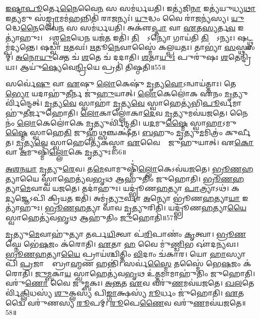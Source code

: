 \ul{𑌇}\ul{𑌷𑍍𑌟𑌾}\ul{𑌪𑍂}𑌰𑍍𑌤𑍇\ul{𑌨𑍈}𑌵𑍈\ul{𑌨}\ul{} 𑌸 𑌸𑌮॑𑌰𑍍𑌧𑌯𑌤𑌿।
𑌇𑌤𑍍𑌯॑𑌜𑌿\ul{𑌨𑌾} 𑌇𑌤𑍍𑌯॑𑌯𑍁𑌧𑍍𑌯\ul{𑌥𑌾} 𑌇\ul{𑌤𑍍𑌯}𑌮𑍁 𑌸॑\ul{𑌙𑍍𑌗𑍍𑌰𑌾}𑌮𑌮॑\ul{𑌹}𑌨𑍍𑌨𑌿𑌤𑌿॑ 𑌰𑌾\ul{𑌜}𑌨𑍍𑌯𑌃॑।
\ul{𑌯𑍁}𑌦𑍍𑌧𑌂 𑌵𑍈 𑌰𑌾॑\ul{𑌜}𑌨𑍍𑌯॑𑌸𑍍𑌯।
\ul{𑌯𑍁}𑌦𑍍𑌧𑍇\ul{𑌨𑍈}𑌵𑍈\ul{𑌨}\ul{} 𑌸 𑌸𑌮॑𑌰𑍍𑌧𑌯𑌤𑌿।
𑌅𑌕𑍢॑\ul{𑌪𑍍𑌤𑌾} 𑌵𑌾 \ul{𑌏}𑌤\ul{𑌸𑍍𑌯}𑌰𑍍𑌤\ul{𑌵} 𑌇𑌤𑍍𑌯𑌾॑𑌹𑍁𑌃।
𑌯𑍋᳚𑌽𑌶𑍍𑌵\ul{𑌮𑍇}𑌧𑍇\ul{𑌨} 𑌯𑌜॑\ul{𑌤} 𑌇𑌤𑌿॑।
\ul{𑌤𑌿}𑌸𑍍𑌰𑍋᳚\-𑌽𑌨𑍍𑌯𑍋 𑌗𑌾𑌯॑𑌤𑌿 \ul{𑌤𑌿}𑌸𑍍𑌰𑍋᳚\-𑌽𑌨𑍍𑌯𑌃।
𑌷𑌟𑍍𑌥𑍍𑌸𑌮𑍍𑌪॑𑌦𑍍𑌯𑌨𑍍𑌤𑍇।
𑌷𑌡𑍍𑌵𑌾 \ul{𑌋}𑌤𑌵𑌃॑।
\ul{𑌋}𑌤𑍂\ul{𑌨𑍇}𑌵𑌾𑌸𑍍𑌮𑍈॑ 𑌕𑌲𑍍𑌪𑌯𑌤𑌃।
𑌤𑌾𑌭𑍍𑌯𑌾॑ \ul{𑌸}\ul{}𑌸𑍍𑌥𑌾𑌯𑌾᳚𑌮𑍍।
\ul{𑌅}\ul{𑌨𑍋}\ul{𑌯𑍁}𑌕𑍍𑌤𑍇 𑌚॑ \ul{𑌶}𑌤𑍇 𑌚॑ 𑌦𑌦𑌾𑌤𑌿।
\ul{𑌶}𑌤𑌾\ul{𑌯𑍁𑌃} 𑌪𑍁𑌰𑍁॑𑌷𑌃 \ul{𑌶}𑌤𑍇𑌨𑍍𑌦𑍍𑌰𑌿॑𑌯𑌃।
𑌆𑌯𑍁॑\ul{𑌷𑍍𑌯𑍇}𑌵𑍇\ul{𑌨𑍍𑌦𑍍𑌰𑌿}𑌯𑍇 𑌪𑍍𑌰𑌤𑌿॑ 𑌤𑌿𑌷𑍍𑌠𑌤𑌿॥55॥\anuvakamend[𑌗𑌾𑌯𑍇॑𑌤𑌾𑌙𑍍𑌕𑍍𑌰𑌾𑌮𑍇𑌦𑍍𑌬𑍍𑌰𑌾\ul{𑌹𑍍𑌮}𑌣𑌸𑍍𑌯॑ 𑌕𑌲𑍍𑌪𑌯𑌤\ul{𑌶𑍍𑌚}𑌤𑍍𑌵𑌾𑌰𑌿॑ 𑌚]

𑌸𑌰𑍍𑌵𑍇॑\ul{𑌷𑍁} 𑌵𑌾 \ul{𑌏}𑌷𑍁 \ul{𑌲𑍋}𑌕𑍇𑌷𑍁॑ \ul{𑌮𑍃}𑌤𑍍𑌯\ul{𑌵𑍋}\-𑌽𑌨𑍍𑌵𑌾𑌯॑𑌤𑍍𑌤𑌾𑌃।
𑌤𑍇\ul{𑌭𑍍𑌯𑍋} 𑌯𑌦𑌾𑌹𑍁॑\ul{𑌤𑍀}𑌰𑍍𑌨 𑌜𑍁॑\ul{𑌹𑍁}𑌯𑌾𑌤𑍍।
\ul{𑌲𑍋}𑌕𑍇𑌲𑍋॑𑌕 𑌏𑌨𑌂 \ul{𑌮𑍃}𑌤𑍍𑌯𑍁𑌰𑍍𑌵𑌿॑𑌨𑍍𑌦𑍇𑌤𑍍।
\ul{𑌮𑍃}𑌤𑍍𑌯\ul{𑌵𑍇} 𑌸𑍍𑌵𑌾𑌹𑌾॑ \ul{𑌮𑍃}𑌤𑍍𑌯\ul{𑌵𑍇} 𑌸𑍍𑌵𑌾𑌹𑍇𑌤𑍍𑌯॑𑌭𑌿\ul{𑌪𑍂}𑌰𑍍𑌵𑌮𑌾𑌹𑍁॑𑌤𑍀𑌰𑍍𑌜𑍁𑌹𑍋𑌤𑌿।
\ul{𑌲𑍋}𑌕𑌾𑌲𑍍𑌲𑍋॑𑌕𑌾\ul{𑌦𑍇}𑌵 \ul{𑌮𑍃}𑌤𑍍𑌯𑍁𑌮𑌵॑𑌯𑌜𑌤𑍇।
𑌨𑍈𑌨𑌂॑ \ul{𑌲𑍋}𑌕𑍇𑌲𑍋॑𑌕𑍇 \ul{𑌮𑍃}𑌤𑍍𑌯𑍁𑌰𑍍𑌵𑌿॑𑌨𑍍𑌦𑌤𑌿।
𑌯\ul{𑌦}𑌮𑍁\ul{𑌷𑍍𑌮𑍈} 𑌸𑍍𑌵𑌾\ul{𑌹𑌾}\-𑌽𑌮𑍁\ul{𑌷𑍍𑌮𑍈} 𑌸𑍍𑌵𑌾𑌹𑍇\ul{𑌤𑌿} 𑌜𑍁𑌹𑍍𑌵॑\ul{𑌥𑍍𑌸}𑌞𑍍𑌚𑌕𑍍𑌷𑍀॑𑌤।
\ul{𑌬}𑌹𑍁𑌂 \ul{𑌮𑍃}𑌤𑍍𑌯𑍁\ul{𑌮}𑌮𑌿𑌤𑍍𑌰𑌂॑ 𑌕𑍁𑌰𑍍𑌵𑍀𑌤।
\ul{𑌮𑍃}𑌤𑍍𑌯\ul{𑌵𑍇} 𑌸𑍍𑌵𑌾𑌹𑍇𑌤𑍍𑌯𑍇𑌕॑𑌸𑍍𑌮𑌾 \ul{𑌏}𑌵𑍈𑌕𑌾𑌂᳚ 𑌜𑍁𑌹𑍁𑌯𑌾𑌤𑍍।
𑌏\ul{𑌕𑍋} 𑌵𑌾 \ul{𑌅}𑌮𑍁𑌷𑍍𑌮𑌿𑌁॑\ul{𑌲𑍍𑌲𑍋}𑌕𑍇 \ul{𑌮𑍃}𑌤𑍍𑌯𑍁𑌃॥56॥

\ul{𑌅}\ul{𑌶}\ul{𑌨}\ul{𑌯𑌾} \ul{𑌮𑍃}𑌤𑍍𑌯𑍁\ul{𑌰𑍇}𑌵।
𑌤\ul{𑌮𑍇}𑌵𑌾𑌮𑍁𑌷𑍍𑌮𑌿𑌁॑\ul{𑌲𑍍𑌲𑍋}𑌕𑍇\-𑌽𑌵॑𑌯𑌜𑌤𑍇।
\ul{𑌭𑍍𑌰𑍂}\ul{𑌣}\ul{𑌹}𑌤𑍍𑌯𑌾𑌯𑍈 𑌸𑍍𑌵𑌾𑌹𑍇𑌤𑍍𑌯॑𑌵\ul{𑌭𑍃}𑌥 𑌆𑌹𑍁॑𑌤𑌿𑌂 𑌜𑍁𑌹𑍋𑌤𑌿।
\ul{𑌭𑍍𑌰𑍂}\ul{𑌣}\ul{𑌹}𑌤𑍍𑌯𑌾\ul{𑌮𑍇}𑌵𑌾𑌵॑ 𑌯𑌜𑌤𑍇।
𑌤𑌦𑌾॑𑌹𑍁𑌃।
𑌯𑌦𑍍𑌭𑍍𑌰𑍂॑𑌣\ul{𑌹}𑌤𑍍𑌯𑌾 \ul{𑌪𑌾}𑌤𑍍𑌰𑍍𑌯𑌾𑌽𑌥॑।
𑌕𑌸𑍍𑌮𑌾᳚\ul{𑌦𑍍𑌯}𑌜𑍍𑌞𑍇𑌽𑌪𑌿॑ 𑌕𑍍𑌰𑌿𑌯\ul{𑌤} 𑌇𑌤𑌿॑।
𑌅𑌮𑍃॑\ul{𑌤𑍍𑌯𑍁}𑌰𑍍𑌵𑌾 \ul{𑌅}𑌨𑍍𑌯𑍋 𑌭𑍍𑌰𑍂॑𑌣\ul{𑌹}𑌤𑍍𑌯𑌾\ul{𑌯𑌾} 𑌇𑌤𑍍𑌯𑌾॑𑌹𑍁𑌃।
\ul{𑌭𑍍𑌰𑍂}\ul{𑌣}\ul{𑌹}𑌤𑍍𑌯𑌾 𑌵𑌾𑌵 \ul{𑌮𑍃}𑌤𑍍𑌯𑍁𑌰𑌿𑌤𑌿॑।
𑌯𑌦𑍍𑌭𑍍𑌰𑍂॑𑌣\ul{𑌹}𑌤𑍍𑌯𑌾\ul{𑌯𑍈} 𑌸𑍍𑌵𑌾𑌹𑍇𑌤𑍍𑌯॑𑌵\ul{𑌭𑍃}𑌥 𑌆𑌹𑍁॑𑌤𑌿𑌂 \ul{𑌜𑍁}𑌹𑍋𑌤𑌿॑॥57॥

\ul{𑌮𑍃}𑌤𑍍𑌯𑍁\ul{𑌮𑍇}𑌵𑌾𑌹𑍁॑𑌤𑍍𑌯𑌾 𑌤𑌰𑍍𑌪\ul{𑌯𑌿}𑌤𑍍𑌵𑌾 𑌪॑\ul{𑌰𑌿}𑌪𑌾𑌣𑌂॑ \ul{𑌕𑍃}𑌤𑍍𑌵𑌾।
\ul{𑌭𑍍𑌰𑍂}\ul{𑌣}𑌘𑍍𑌨𑍇 𑌭𑍇॑\ul{𑌷}𑌜𑌂 𑌕॑𑌰𑍋𑌤𑌿।
\ul{𑌏}𑌤𑌾 \ul{𑌹} 𑌵𑍈 𑌮𑍁॑\ul{𑌣𑍍𑌡𑌿}𑌭 𑌔॑𑌦\ul{𑌨𑍍𑌯}𑌵𑌃।
\ul{𑌭𑍍𑌰𑍂}\ul{𑌣}\ul{𑌹}𑌤𑍍𑌯𑌾\ul{𑌯𑍈} 𑌪𑍍𑌰𑌾𑌯॑𑌶𑍍𑌚𑌿𑌤𑍍𑌤𑌿𑌂 \ul{𑌵𑌿}𑌦𑌾𑌂 𑌚॑𑌕𑌾𑌰।
𑌯𑍋 \ul{𑌹𑌾}𑌸𑍍𑌯𑌾𑌪𑌿॑ \ul{𑌪𑍍𑌰}𑌜𑌾𑌯𑌾𑌂᳚ 𑌬𑍍𑌰𑌾\ul{𑌹𑍍𑌮}𑌣 𑌹𑌨𑍍𑌤𑌿॑।
𑌸𑌰𑍍𑌵॑\ul{𑌸𑍍𑌮𑍈} 𑌤𑌸𑍍𑌮𑍈॑ 𑌭𑍇\ul{𑌷}𑌜𑌂 𑌕॑𑌰𑍋𑌤𑌿।
\ul{𑌜𑍁}\ul{𑌮𑍍𑌬}𑌕𑌾\ul{𑌯} 𑌸𑍍𑌵𑌾𑌹𑍇𑌤𑍍𑌯॑𑌵\ul{𑌭𑍃}𑌥 𑌉॑\ul{𑌤𑍍𑌤}𑌮𑌾𑌮𑌾𑌹𑍁॑𑌤𑌿𑌂 𑌜𑍁𑌹𑍋𑌤𑌿।
𑌵𑌰𑍁॑\ul{𑌣𑍋} 𑌵𑍈 𑌜𑍁॑\ul{𑌮𑍍𑌬}𑌕𑌃।
\ul{𑌅}\ul{𑌨𑍍𑌤}𑌤 \ul{𑌏}𑌵 𑌵𑌰𑍁॑\ul{𑌣}𑌮𑌵॑𑌯𑌜𑌤𑍇।
\ul{𑌖}\ul{𑌲}𑌤𑍇𑌰𑍍𑌵𑌿॑\ul{𑌕𑍍𑌲𑌿}𑌧𑌸𑍍𑌯॑ \ul{𑌶𑍁}𑌕𑍍𑌲𑌸𑍍𑌯॑ 𑌪𑌿\ul{𑌙𑍍𑌗𑌾}𑌕𑍍𑌷𑌸𑍍𑌯॑ \ul{𑌮𑍂}𑌰𑍍𑌧𑌂 𑌜𑍁॑𑌹𑍋𑌤𑌿।
\ul{𑌏}𑌤𑌦𑍍𑌵𑍈 𑌵𑌰𑍁॑𑌣𑌸𑍍𑌯 \ul{𑌰𑍂}𑌪𑌮𑍍।
\ul{𑌰𑍂}𑌪𑍇\ul{𑌣𑍈}𑌵 𑌵𑌰𑍁॑\ul{𑌣}𑌮𑌵॑𑌯𑌜𑌤𑍇॥58॥\anuvakamend[\ul{𑌲𑍋}𑌕𑍇 \ul{𑌮𑍃}𑌤𑍍𑌯𑍁\ul{𑌰𑍍𑌜𑍁}𑌹𑍋𑌤𑌿॑ \ul{𑌮𑍂}𑌰𑍍𑌧𑌂 𑌜𑍁॑𑌹𑍋\ul{𑌤𑌿} 𑌦𑍍𑌵𑍇 𑌚॑]

